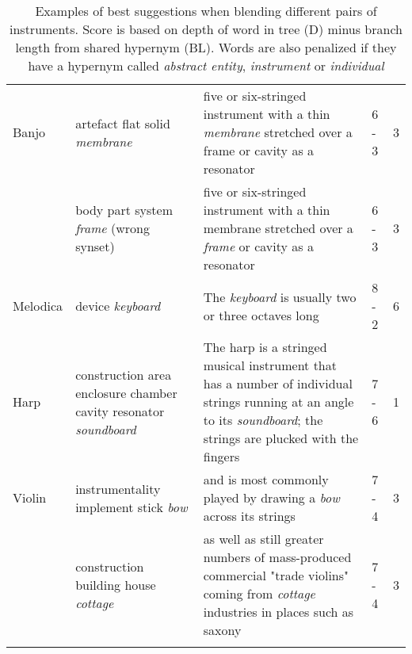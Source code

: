 \begin{table}
	\caption{Examples of best suggestions when blending different pairs of instruments. Score is based on depth of word in tree (D) minus branch length from shared hypernym (BL). Words are also penalized if they have a hypernym called \emph{abstract entity}, \emph{instrument} or \emph{individual}}
	\label{tab:topscoringexamplespenalty}
	\centering
	\begin{tabular}{l p{30mm} p{30mm} l l}
		\toprule
		\tabhead{Instrument} & \tabhead{Top scoring branch} & \tabhead{Context} & \tabhead{D - BL} & \tabhead{Score} \\
		\midrule
		Banjo &
		artefact \newline
		flat solid \newline
		\emph{membrane} & five or six-stringed instrument with a thin \emph{membrane} stretched over a frame or cavity as a resonator & 6 - 3 & 3	\\
		&
		body part \newline
		system \newline
		\emph{frame} \newline
		(wrong synset)
		& five or six-stringed instrument with a thin membrane stretched over a \emph{frame} or cavity as a resonator & 6 - 3 & 3	\\
		Melodica &
		device \newline 
		\emph{keyboard} &
		The \emph{keyboard} is usually two or three octaves long & 8 - 2 &	6
		\\
		\midrule
		Harp &
		construction \newline
		area \newline
		enclosure \newline
		chamber \newline
		cavity resonator \newline
		\emph{soundboard} & The harp is a stringed musical instrument that has a number of individual strings running at an angle to its \emph{soundboard}; the strings are plucked with the fingers & 7 - 6 & 1	\\
		Violin &
		instrumentality \newline
		implement \newline
		stick \newline
		\emph{bow} & and is most commonly played by drawing a \emph{bow} across its strings \newline & 7 - 4 & 3	\\
		&
		construction \newline
		building \newline
		house \newline
		\emph{cottage} & 
		as well as still greater numbers of mass-produced commercial "trade violins" coming from \emph{cottage} industries in places such as saxony & 7 - 4 & 3	
		\\
		\bottomrule\\
	\end{tabular}
\end{table}

